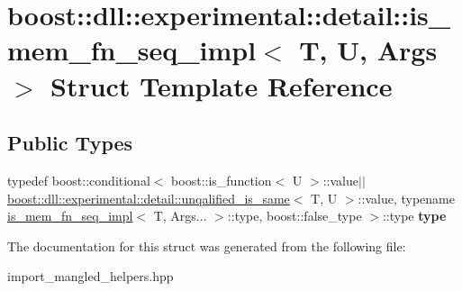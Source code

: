 \hypertarget{a00176}{}\section{boost\+:\+:dll\+:\+:experimental\+:\+:detail\+:\+:is\+\_\+mem\+\_\+fn\+\_\+seq\+\_\+impl$<$ T, U, Args $>$ Struct Template Reference}
\label{a00176}
\subsection*{Public Types}
\begin{DoxyCompactItemize}
\item 
typedef boost\+::conditional$<$ boost\+::is\+\_\+function$<$ U $>$\+::value$\vert$$\vert$\hyperlink{a00325}{boost\+::dll\+::experimental\+::detail\+::unqalified\+\_\+is\+\_\+same}$<$ T, U $>$\+::value, typename \hyperlink{a00176}{is\+\_\+mem\+\_\+fn\+\_\+seq\+\_\+impl}$<$ T, Args... $>$\+::type, boost\+::false\+\_\+type $>$\+::type {\bfseries type}\hypertarget{a00176_a5b0ef01b378457cb1ffabfae4a1ed68f}{}\label{a00176_a5b0ef01b378457cb1ffabfae4a1ed68f}

\end{DoxyCompactItemize}


The documentation for this struct was generated from the following file\+:\begin{DoxyCompactItemize}
\item 
import\+\_\+mangled\+\_\+helpers.\+hpp\end{DoxyCompactItemize}
